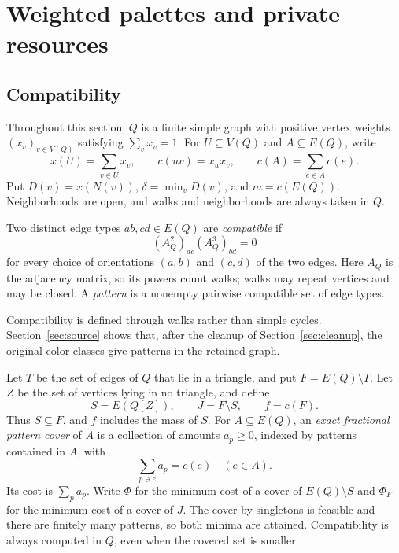 \section{Weighted palettes and private resources}\label{sec:palettes}
\subsection{Compatibility}
Throughout this section, $Q$ is a finite simple graph with positive vertex weights $(x_v)_{v\in V(Q)}$ satisfying $\sum_vx_v=1$. For $U\subseteq V(Q)$ and $A\subseteq E(Q)$, write
\[
 x(U)=\sum_{v\in U}x_v,\qquad c(uv)=x_ux_v,\qquad
 c(A)=\sum_{e\in A}c(e).
\]
Put $D(v)=x(N(v))$, $\delta=\min_vD(v)$, and $m=c(E(Q))$. Neighborhoods are open, and walks and neighborhoods are always taken in $Q$.

\begin{definition}\label{def:compatibility}
Two distinct edge types $ab,cd\in E(Q)$ are \emph{compatible} if
\begin{equation}\label{eq:compatibility}
 (A_Q^2)_{ac}(A_Q^3)_{bd}=0
\end{equation}
for every choice of orientations $(a,b)$ and $(c,d)$ of the two edges. Here $A_Q$ is the adjacency matrix, so its powers count walks; walks may repeat vertices and may be closed. A \emph{pattern} is a nonempty pairwise compatible set of edge types.
\end{definition}
Compatibility is defined through walks rather than simple cycles. Section~\ref{sec:source} shows that, after the cleanup of Section~\ref{sec:cleanup}, the original color classes give patterns in the retained graph.

Let $T$ be the set of edges of $Q$ that lie in a triangle, and put $F=E(Q)\setminus T$. Let $Z$ be the set of vertices lying in no triangle, and define
\begin{equation}\label{eq:sectors}
 S=E(Q[Z]),\qquad J=F\setminus S,\qquad f=c(F).
\end{equation}
Thus $S\subseteq F$, and $f$ includes the mass of $S$.
For $A\subseteq E(Q)$, an \emph{exact fractional pattern cover} of $A$ is a collection of amounts $a_p\ge0$, indexed by patterns contained in $A$, with
\begin{equation}\label{eq:exactcover}
 \sum_{p\ni e}a_p=c(e)\quad(e\in A).
\end{equation}
Its cost is $\sum_pa_p$. Write $\Phi$ for the minimum cost of a cover of $E(Q)\setminus S$ and $\Phi_F$ for the minimum cost of a cover of $J$. The cover by singletons is feasible and there are finitely many patterns, so both minima are attained. Compatibility is always computed in $Q$, even when the covered set is smaller.

